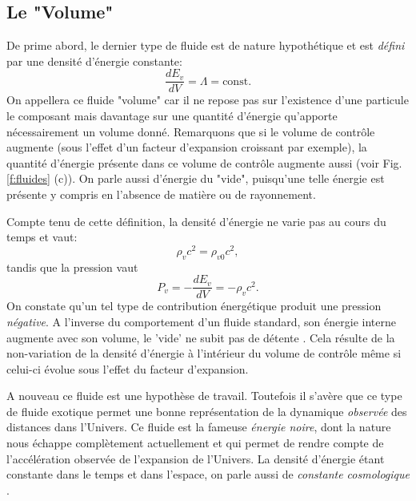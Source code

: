 \subsection{Le "Volume"}
De prime abord, le dernier type de fluide est de nature hypothétique et est \textit{défini} par une densité d'énergie constante:
\begin{equation}
\frac{dE_v}{dV}=\Lambda=\mathrm{const.}
\end{equation}
On appellera ce fluide "volume" car il ne repose pas sur l'existence d'une particule le composant mais davantage sur une quantité d'énergie qu'apporte nécessairement un volume donné. Remarquons que si le volume de contrôle augmente (sous l'effet d'un facteur d'expansion croissant par exemple), la quantité d'énergie présente dans ce volume de contrôle augmente aussi (voir Fig. \ref{f:fluides} (c)).  On parle aussi d'énergie du "vide", puisqu'une telle énergie est présente y compris en l'absence de matière ou de rayonnement.

Compte tenu de cette définition, la densité d'énergie ne varie pas au cours du temps et vaut:
\begin{equation}
\rho_vc^2=\rho_{v0}c^2,
\end{equation}
tandis que la pression vaut
\begin{equation}
P_v=-\frac{dE_v}{dV}=-\rho_vc^2.
\end{equation}
On constate qu'un tel type de contribution énergétique produit une pression \textit{négative}. A l'inverse du comportement d'un fluide standard, son énergie interne augmente avec son volume, le 'vide' ne subit pas de détente . Cela résulte de la non-variation de la densité d'énergie à l'intérieur du volume de contrôle même si celui-ci évolue sous l'effet du facteur d'expansion.

A nouveau ce fluide est une hypothèse de travail. Toutefois il s'avère que ce type de fluide exotique permet une bonne représentation de la dynamique \textit{observée} des distances dans l'Univers. Ce fluide est la fameuse \textit{énergie noire}, dont la nature nous échappe complètement actuellement et qui permet de rendre compte de l'accélération observée de l'expansion de l'Univers. La densité d'énergie étant constante dans le temps et dans l'espace, on parle aussi de \textit{constante cosmologique} .

